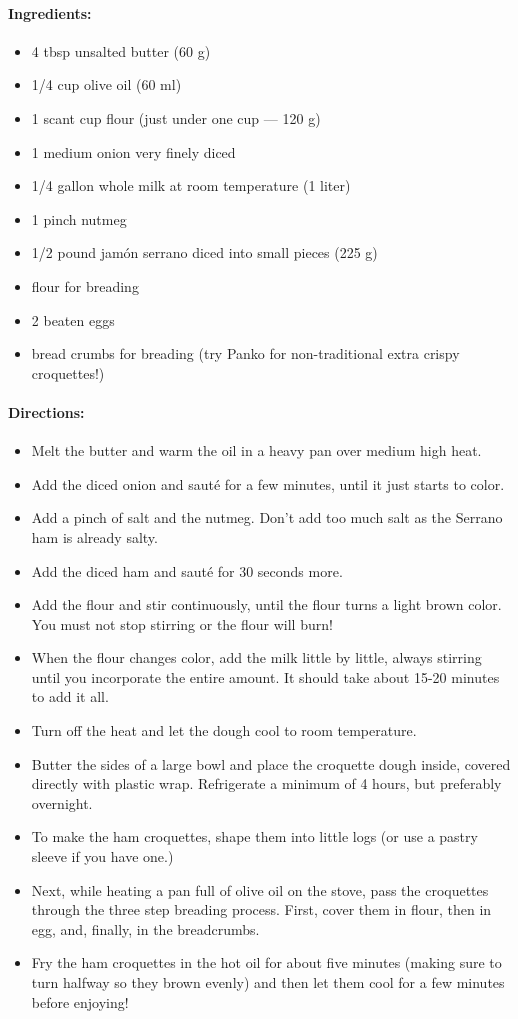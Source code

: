 \documentclass{article}
\begin{document}
\paragraph{Ingredients:}
\begin{itemize}
    \item 4 tbsp unsalted butter (60 g)
    \item 1/4 cup olive oil (60 ml)
    \item 1 scant cup flour (just under one cup — 120 g)
    \item 1 medium onion very finely diced
    \item 1/4 gallon whole milk at room temperature (1 liter)
    \item 1 pinch nutmeg
    \item 1/2 pound jamón serrano diced into small pieces (225 g)
    \item flour for breading
    \item 2 beaten eggs
    \item bread crumbs for breading (try Panko for non-traditional extra crispy croquettes!)
\end{itemize}

\paragraph{Directions:}
\begin{itemize}
    \item Melt the butter and warm the oil in a heavy pan over medium high heat.
    \item Add the diced onion and sauté for a few minutes, until it just starts to color.
    \item Add a pinch of salt and the nutmeg. Don't add too much salt as the Serrano ham is already salty.
    \item Add the diced ham and sauté for 30 seconds more.
    \item Add the flour and stir continuously, until the flour turns a light brown color. You must not stop stirring or the flour will burn!
    \item When the flour changes color, add the milk little by little, always stirring until you incorporate the entire amount. It should take about 15-20 minutes to add it all.
    \item Turn off the heat and let the dough cool to room temperature.
    \item Butter the sides of a large bowl and place the croquette dough inside, covered directly with plastic wrap. Refrigerate a minimum of 4 hours, but preferably overnight.
    \item To make the ham croquettes, shape them into little logs (or use a pastry sleeve if you have one.)
    \item Next, while heating a pan full of olive oil on the stove, pass the croquettes through the three step breading process. First, cover them in flour, then in egg, and, finally, in the breadcrumbs.
    \item Fry the ham croquettes in the hot oil for about five minutes (making sure to turn halfway so they brown evenly) and then let them cool for a few minutes before enjoying!
\end{itemize}
\end{document}
